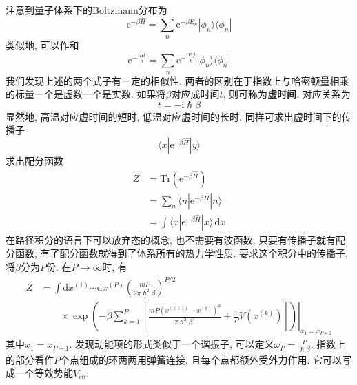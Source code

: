         注意到量子体系下的Boltzmann分布为
        \begin{equation}
            \mathrm{e}^{-\beta \hat{H}} = \sum_n \mathrm{e}^{-\beta E_n} |\phi_n \rangle \langle \phi_n|
        \end{equation}
        类似地, 可以作和
        \begin{equation}
            \mathrm{e}^{-\frac {\mathrm{i}\hat{H}t}{\hslash}} = \sum_n \mathrm{e}^{-\frac {\mathrm{i}E_n t}{\hslash}} |\phi_n \rangle \langle \phi_n|
        \end{equation}
        我们发现上述的两个式子有一定的相似性. 两者的区别在于指数上与哈密顿量相乘的标量一个是虚数一个是实数. 如果将$\beta$对应成时间$t$, 则可称为\textbf{虚时间}. 对应关系为
        \begin{equation}
            t = -\mathrm{i}\hslash \beta
        \end{equation}
        显然地, 高温对应虚时间的短时, 低温对应虚时间的长时. 同样可求出虚时间下的传播子
        \begin{equation}
            \langle x|\mathrm{e}^{-\beta \hat{H}}|y\rangle
        \end{equation}
        求出配分函数
        \begin{equation}\begin{aligned}
            Z &= \mathrm{Tr}(\mathrm{e}^{-\beta \hat{H}}) \\
            &= \sum_n \langle n| \mathrm{e}^{-\beta \hat{H}}|n\rangle \\
            &= \int \langle x|\mathrm{e}^{-\beta \hat{H}}|x\rangle \,\mathrm{d}x
        \end{aligned}\end{equation}
        在路径积分的语言下可以放弃态的概念, 也不需要有波函数, 只要有传播子就有配分函数, 有了配分函数就得到了体系所有的热力学性质. 要求这个积分中的传播子, 将$\beta$分为$P$份. 在$P \to \infty$时, 有
        \begin{equation}\begin{aligned}
            Z &= \int \mathrm{d} x^{(1)} \cdots \mathrm{d} x^{(P)} \left(\frac{mP}{2\pi \hslash^2 \beta}\right)^{P/2} \\ & \qquad\times\left.
            \exp\left( -\beta \sum_{k=1}^{P} \left[\frac{mP(x^{(k+1)}-x^{(k)})^2}{2\hslash^2 \beta^2}+\frac{1}{P}V(x^{(k)})\right]\right)\right|_{x_1 = x_{P+1}}
        \end{aligned}\end{equation}
        其中$x_1 = x_{P+1}$. 发现动能项的形式类似于一个谐振子, 可以定义$\omega_P = \frac P{\hslash \beta}$. 指数上的部分看作$P$个点组成的环两两用弹簧连接, 且每个点都额外受外力作用. 它可以写成一个等效势能$V_\mathrm{eff}$:
